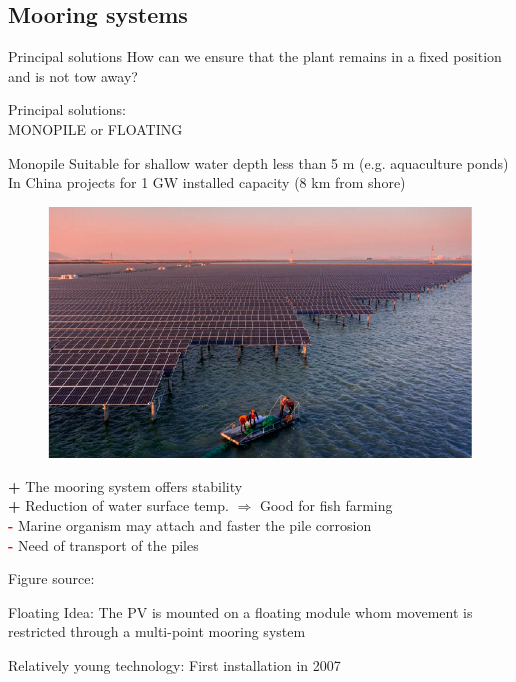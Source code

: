 \documentclass[aspectratio=169, 12pt]{beamer}
\begin{document}
\subsection{Mooring systems}
\begin{frame}{Principal solutions}{\insertsubsection}
  How can we ensure that the plant remains in a fixed position and is not tow away?

  Principal solutions:\\
  \textcolor{NTNUBlue}{MONOPILE} or \textcolor{NTNUBlue}{FLOATING}
  
\end{frame}

\begin{frame}{Monopile}{\insertsubsection}
  Suitable for shallow water depth less than 5 m (e.g. aquaculture ponds)\\
  In China projects for 1 GW installed capacity (8 km from shore)

  \begin{figure}
    \centering
    \includegraphics[width=0.3\columnwidth]{figure/floating_PV_china.png}
  \end{figure}

  \textcolor{NTNUgreen}{\textbf{+}} The mooring system offers stability\\
  \textcolor{NTNUgreen}{\textbf{+}} Reduction of water surface temp. $\Rightarrow$ Good for fish farming\\
  \textcolor{red}{\textbf{-}} Marine organism may attach and faster the pile corrosion\\
  \textcolor{red}{\textbf{-}} Need of transport of the piles

  {\tiny Figure source: \cite{jmse11112064}}
\end{frame}

\begin{frame}{Floating}{\insertsubsection}
  \textcolor{NTNUBlue}{Idea:} The PV is mounted on a floating module whom movement is restricted through a multi-point mooring system 
  
  \textcolor{NTNUBlue}{Relatively young technology: }First installation in 2007

\end{frame}
\end{document}
